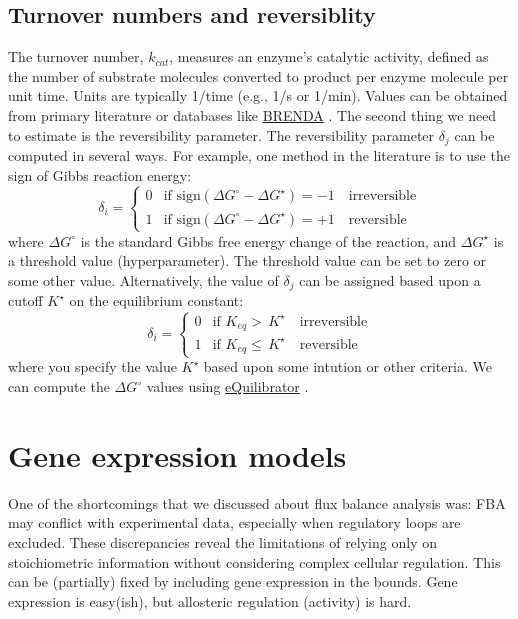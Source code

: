 \documentclass{article}[11pt]
\begin{document}
\subsection{Turnover numbers and reversiblity}
The turnover number, $k_{cat}$, measures an enzyme's catalytic activity, defined as the number of substrate molecules converted to product per enzyme molecule per unit time. Units are typically 1/time (e.g., 1/s or 1/min). 
Values can be obtained from primary literature or databases like \href{https://www.brenda-enzymes.org/}{BRENDA} \citep{BRENDA2021}.
The second thing we need to estimate is the reversibility parameter.
The reversibility parameter $\delta_{j}$ can be computed in several ways. For example, one method in the literature is to use the sign of Gibbs reaction energy:
\begin{equation*}
\delta_{i} = \begin{cases}
0 & \text{if }\text{sign}\left(\Delta{G}^{\circ} - \Delta{G}^{\star}\right)= -1 \quad\text{irreversible} \\
1 & \text{if }\text{sign}\left(\Delta{G}^{\circ} - \Delta{G}^{\star}\right)= +1 \quad\text{reversible}
\end{cases}
\end{equation*}
where $\Delta{G}^{\circ}$ is the standard Gibbs free energy change of the reaction, and $\Delta{G}^{\star}$ is a threshold value (hyperparameter). 
The threshold value can be set to zero or some other value. Alternatively, the value of $\delta_{j}$ can be assigned based upon a cutoff $K^{\star}$ on the equilibrium constant:
\begin{equation*}
\delta_{i} = \begin{cases}
0 & \text{if }K_{eq}>\,K^{\star}\quad\text{irreversible} \\
1 & \text{if }K_{eq}\leq\,K^{\star}\quad\text{reversible}
\end{cases}
\end{equation*}
where you specify the value $K^{\star}$ based upon some intution or other criteria. We can compute the $\Delta{G}^{\circ}$ values using \href{ttps://equilibrator.weizmann.ac.il}{eQuilibrator} \citep{Beber:2022aa}.

\section{Gene expression models}
One of the shortcomings that we discussed about flux balance analysis was: 
FBA may conflict with experimental data, especially when regulatory loops are excluded. 
These discrepancies reveal the limitations of relying only on stoichiometric information without considering complex cellular regulation. 
This can be (partially) fixed by including gene expression in the bounds.
Gene expression is easy(ish), but allosteric regulation (activity) is hard.
\end{document}
